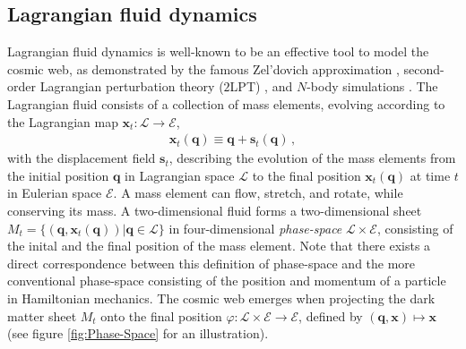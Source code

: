 \documentclass[a4paper, 11pt]{article}
\begin{document}
\subsection{Lagrangian fluid dynamics}
Lagrangian fluid dynamics is well-known to be an effective tool to model the cosmic web, as demonstrated by the famous Zel'dovich approximation \cite{Zeldovich:1970}, second-order Lagrangian perturbation theory ($2$LPT) \cite{Buchert:1992, Buchert:1993a, Buchert:1993b, Buchert:1994a, Buchert:1994b, Bouchet:1995}, and $N$-body simulations \cite{Springel:2005, illustris:2014, eagle:2015}. The Lagrangian fluid consists of a collection of mass elements, evolving according to the Lagrangian map $\bm{x}_t:\mathcal{L}\to \mathcal{E}$,
\begin{align}
\bm{x}_t(\bm{q}) \equiv \bm{q} + \bm{s}_t(\bm{q})\,,
\end{align}
with the displacement field $\bm{s}_t$, describing the evolution of the mass elements from the initial position $\bm{q}$ in Lagrangian space $\mathcal{L}$ to the final position $\bm{x}_t(\bm{q})$ at time $t$ in Eulerian space $\mathcal{E}$. A mass element can flow, stretch, and rotate, while conserving its mass. A two-dimensional fluid forms a two-dimensional sheet $M_t=\{(\bm{q},\bm{x}_t(\bm{q})) | \bm{q}\in \mathcal{L}\}$ in four-dimensional \textit{phase-space} $\mathcal{L}\times \mathcal{E}$, consisting of the inital and the final position of the mass element. Note that there exists a direct correspondence between this definition of phase-space and the more conventional phase-space consisting of the position and momentum of a particle in Hamiltonian mechanics. The cosmic web emerges when projecting the dark matter sheet $M_t$ onto the final position $\varphi:\mathcal{L}\times \mathcal{E} \to \mathcal{E}$, defined by $(\bm{q},\bm{x}) \mapsto\bm{x}$ (see figure \ref{fig:Phase-Space} for an illustration).
\end{document}
